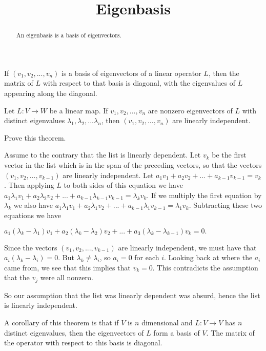 \documentclass{ximera}
\title{Eigenbasis}
\begin{document}
\begin{abstract}
  An eigenbasis is a basis of eigenvectors.
\end{abstract}\maketitle

\begin{observation}
  If $(v_1,v_2,...,v_n)$ is a basis of eigenvectors of a linear
  operator $L$, then the matrix of $L$ with respect to that basis is
  diagonal, with the eigenvalues of $L$ appearing along the diagonal.
\end{observation}

\begin{theorem}
  Let $L:V \to W$ be a linear map. If $v_1,v_2,...,v_n$ are nonzero eigenvectors of $L$ with distinct eigenvalues $\lambda_1,\lambda_2,...\lambda_n$, then $(v_1,v_2,...,v_n)$
  are linearly independent.
\end{theorem}

Prove this theorem.

\begin{free-response}
  Assume to the contrary that the list is linearly dependent.  Let $v_k$ be the first vector in the list which is in the span of the preceding vectors, 
  so that the vectors $(v_1,v_2,...,v_{k-1})$  are linearly independent.  
  Let $a_1v_1+a_2v_2+...+a_{k-1}v_{k-1} = v_k$.  Then applying $L$ to both sides of this equation we have
  $a_1\lambda_1 v_1+a_2\lambda_2 v_2+ ...+a_{k-1}\lambda_{k-1} v_{k-1} = \lambda_k v_k$.  If we multiply the first equation by $\lambda_k$ we also have
  $a_1\lambda_1v_1+a_2\lambda_1v_2+...+a_{k-1}\lambda_1v_{k-1} = \lambda_1v_k$.  Subtracting these two equations we have
  
  \(
  a_1(\lambda_k-\lambda_1)v_1+a_2(\lambda_k-\lambda_2)v_2+...+a_3(\lambda_k-\lambda_{k-1})v_k=0.
  \)
  
  Since the vectors   $(v_1,v_2,...,v_{k-1})$  are linearly independent, we must have that $a_i(\lambda_k - \lambda_i) = 0$.  But $\lambda_k \neq \lambda_i$, so 
  $a_i=0$ for each $i$.  Looking back at where the $a_i$ came from, we see that this implies that $v_k=0$.  This contradicts the assumption that the $v_j$ were all nonzero.
  
  So our assumption that the list was linearly dependent was absurd, hence the list is linearly independent.
\end{free-response}

A corollary of this theorem is that if $V$ is $n$ dimensional and $L: V \to V$ has $n$ distinct eigenvalues, then the eigenvectors of $L$ form a basis of $V$.
The matrix of the operator with respect to this basis is diagonal.
	
\end{document}
